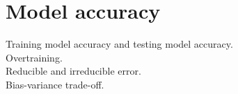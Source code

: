 \section{Model accuracy}


Training model accuracy and testing model accuracy.\\
Overtraining. \\ 	 
Reducible and irreducible error. \\
Bias-variance trade-off. \\